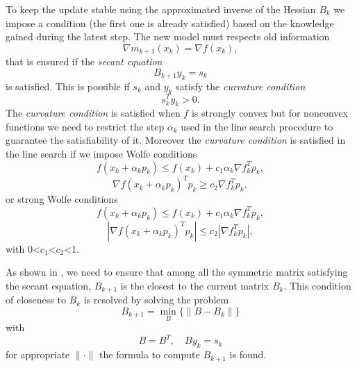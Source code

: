 To keep the update stable using the approximated inverse of the Hessian $B_{k}$ we impose a condition (the first one is already satisfied) based on the knowledge gained during the latest step. The new model must respects old information 
\begin{equation}
\nabla m_{k+1}(x_{k})=\nabla f(x_{k}),
\end{equation}
that is ensured if the \textit{secant equation}
\label{secant-equation}
\begin{equation}
B_{k+1}y_{k}=s_{k}
\end{equation}
is satisfied. This is possible if $s_{k}$ and $y_{k}$ satisfy the \textit{curvature condition} 
\begin{equation}
s_{k}^T y_{k}>0.
\end{equation}
The \textit{curvature condition} is satisfied when $f$ is strongly convex but for nonconvex functions we need to restrict the step $\alpha_{k}$ used in the line search procedure to guarantee the satisfiability of it.
Moreover the \textit{curvature condition} is satisfied in the line search if we impose Wolfe conditions
\begin{equation}
f(x_k + \alpha_kp_k ) \leq f (x_k ) + c_1 \alpha_k \nabla f_k^T p_k,
\end{equation}
\begin{equation}
\nabla f(x_k + \alpha_{k} p_k )^T p_k \geq c_2 \nabla f_k^T p_k ,
\end{equation}
or strong Wolfe conditions
\begin{equation}
f(x_k + \alpha_kp_k ) \leq f (x_k ) + c_1 \alpha_k \nabla f_k^T p_k,
\end{equation}
\begin{equation}
|\nabla f(x_k + \alpha_{k} p_k )^T p_k| \leq c_2 |\nabla f_k^T p_k| ,
\end{equation}
with 0<$c_1$<$c_2$<1. 

As shown in \cite{numerical}, we need to ensure that among all the symmetric matrix satisfying the secant equation, $B_{k+1}$ is the closest to the current matrix $
B_{k}$. This condition of closeness to $B_{k}$ is resolved by solving the problem
\begin{equation}
B_{k+1} = \min_{B} \{\parallel B - B_{k} \parallel\} 
\end{equation}
with 
\begin{equation}
B = B^T, \quad B{y_{k}}= s_{k}
\end{equation}
for appropriate $\parallel \cdot \parallel$ the formula to compute $B_{k+1}$ is found.


